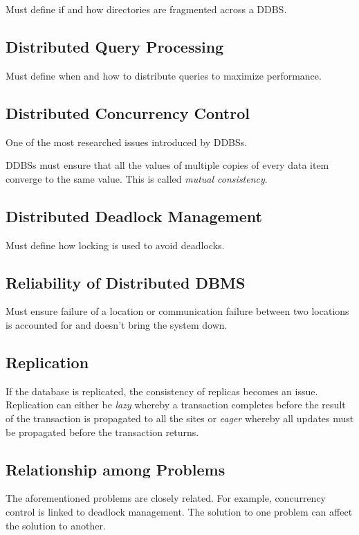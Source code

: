 \documentclass[12pt]{article}
\begin{document}
Must define if and how directories are fragmented across a DDBS.

\subsection{Distributed Query Processing}

Must define when and how to distribute queries to maximize performance.

\subsection{Distributed Concurrency Control}

One of the most researched issues introduced by DDBSs.

DDBSs must ensure that all the values of multiple copies of every data item converge to the same value. This is called \textit{mutual consistency}.

\subsection{Distributed Deadlock Management}

Must define how locking is used to avoid deadlocks.

\subsection{Reliability of Distributed DBMS}

Must ensure failure of a location or communication failure between two locations is accounted for and doesn't bring the system down.

\subsection{Replication}

If the database is replicated, the consistency of replicas becomes an issue. Replication can either be \textit{lazy} whereby a transaction completes before the result of the transaction is propagated to all the sites or \textit{eager} whereby all updates must be propagated before the transaction returns.

\subsection{Relationship among Problems}

The aforementioned problems are closely related. For example, concurrency control is linked to deadlock management. The solution to one problem can affect the solution to another.
\end{document}
